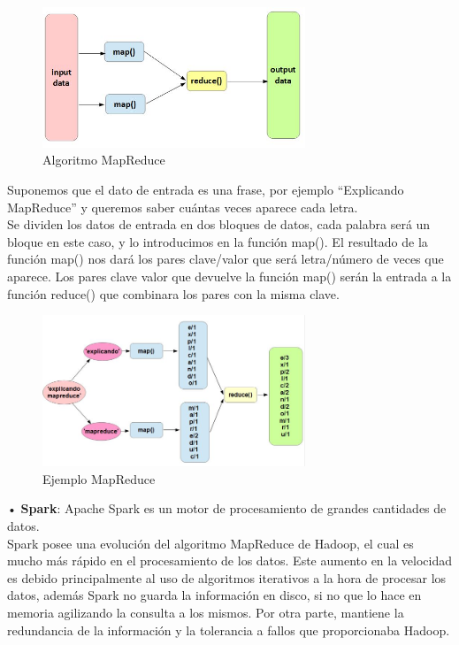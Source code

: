 \begin{figure}[H]
	\centering
	\includegraphics[width=0.7\textwidth]{./imagenes/MapReduce}
	\caption{Algoritmo MapReduce} 
	
\end{figure}

Suponemos que el dato de entrada es una frase, por ejemplo “Explicando MapReduce” y queremos saber cuántas veces aparece cada letra.\\

Se dividen los datos de entrada en dos bloques de datos, cada palabra será un bloque en este caso, y lo introducimos en la función map(). El resultado de la función map() nos dará los pares clave/valor que será letra/número de veces que aparece. Los pares clave valor que devuelve la función map() serán la entrada a la función reduce() que combinara los pares con la misma clave.\\

\begin{figure}[H]
	\centering
	\includegraphics[width=0.7\textwidth]{./imagenes/ejemplo_mapr}
	\caption{Ejemplo MapReduce} 
	
\end{figure}


•	\textbf{Spark}: Apache Spark es un motor de procesamiento de grandes cantidades de datos.\\
 Spark posee una evolución del algoritmo MapReduce de  Hadoop, el cual es mucho más rápido en el procesamiento de los datos.
Este aumento en la velocidad es debido principalmente al uso de algoritmos iterativos a la hora de procesar los datos, además Spark no guarda la información en disco, si no que lo hace en memoria agilizando la consulta a los mismos. Por otra parte, mantiene la redundancia de la información y la tolerancia a fallos que proporcionaba Hadoop.

